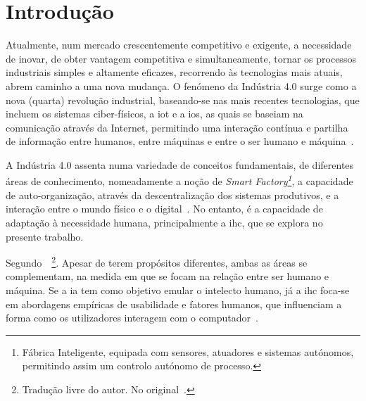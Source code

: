 \chapter{Introdução}
\label{chap:Chapter1}
Atualmente, num mercado crescentemente competitivo e exigente, a necessidade de inovar, de obter vantagem competitiva e simultaneamente, tornar os processos industriais simples e altamente eficazes, recorrendo às tecnologias mais atuais, abrem caminho a uma nova mudança. O fenómeno da Indústria 4.0 surge como a nova (quarta) revolução industrial, baseando-se nas mais recentes tecnologias, que incluem os sistemas ciber-físicos, a \gls{iot} e a \gls{ios}, as quais se baseiam na comunicação através da Internet, permitindo uma interação contínua e partilha de informação entre humanos, entre máquinas e entre o ser humano e máquina~\parencite{complex_view_industry40}. 

A Indústria 4.0 assenta numa variedade de conceitos fundamentais, de diferentes áreas de conhecimento, nomeadamente a noção de \textit{Smart Factory\footnote{Fábrica Inteligente, equipada com sensores, atuadores e sistemas autónomos, permitindo assim um controlo autónomo de processo.}}, a capacidade de auto-organização, através da descentralização dos sistemas produtivos, e a interação entre o mundo físico e o digital~\parencite[Fundamental Concepts, p.240]{industry40}. No entanto, é a capacidade de adaptação à necessidade humana, principalmente a \gls{ihc}, que se explora no presente trabalho.

Segundo~\textcite[p.1]{natural_language_translation_intersaction_ai_hci}~\footnote{Tradução livre do autor. No original~.}. Apesar de terem propósitos diferentes, ambas as áreas se complementam, na medida em que se focam na relação entre ser humano e máquina. Se a \gls{ia} tem como objetivo emular o intelecto humano, já a \gls{ihc} foca-se em abordagens empíricas de usabilidade e fatores humanos, que influenciam a forma como os utilizadores interagem com o computador~\parencite{natural_language_translation_intersaction_ai_hci}. 

